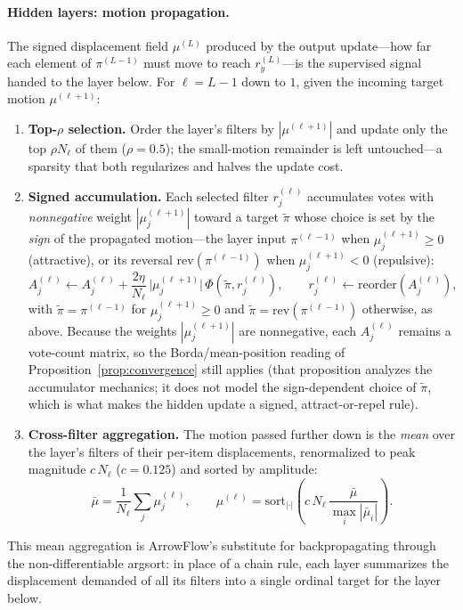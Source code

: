 \documentclass[12pt]{article}
\begin{document}
\paragraph{Hidden layers: motion propagation.}
The signed displacement field $\mu^{(L)}$ produced by the output update---how far each element of $\pi^{(L-1)}$ must move to reach $r^{(L)}_y$---is the supervised signal handed to the layer below. For $\ell = L-1$ down to $1$, given the incoming target motion $\mu^{(\ell+1)}$:
\begin{enumerate}[leftmargin=2em,topsep=2pt]
\item \textbf{Top-$\rho$ selection.} Order the layer's filters by $|\mu^{(\ell+1)}|$ and update only the top $\rho N_\ell$ of them ($\rho = 0.5$); the small-motion remainder is left untouched---a sparsity that both regularizes and halves the update cost.
\item \textbf{Signed accumulation.} Each selected filter $r^{(\ell)}_j$ accumulates votes with \emph{nonnegative} weight $|\mu^{(\ell+1)}_j|$ toward a target $\tilde{\pi}$ whose choice is set by the \emph{sign} of the propagated motion---the layer input $\pi^{(\ell-1)}$ when $\mu^{(\ell+1)}_j \ge 0$ (attractive), or its reversal $\mathrm{rev}(\pi^{(\ell-1)})$ when $\mu^{(\ell+1)}_j < 0$ (repulsive):
\begin{equation}
\label{eq:hidden-update}
A^{(\ell)}_j \leftarrow A^{(\ell)}_j + \frac{2\eta}{N_\ell}\,\bigl|\mu^{(\ell+1)}_j\bigr|\,\Phi\!\left(\tilde{\pi}, r^{(\ell)}_j\right), \qquad
r^{(\ell)}_j \leftarrow \mathrm{reorder}(A^{(\ell)}_j),
\end{equation}
with $\tilde{\pi} = \pi^{(\ell-1)}$ for $\mu^{(\ell+1)}_j \ge 0$ and $\tilde{\pi} = \mathrm{rev}(\pi^{(\ell-1)})$ otherwise, as above.
Because the weights $|\mu^{(\ell+1)}_j|$ are nonnegative, each $A^{(\ell)}_j$ remains a vote-count matrix, so the Borda/mean-position reading of Proposition~\ref{prop:convergence} still applies (that proposition analyzes the accumulator mechanics; it does not model the sign-dependent choice of $\tilde{\pi}$, which is what makes the hidden update a signed, attract-or-repel rule).
\item \textbf{Cross-filter aggregation.} The motion passed further down is the \emph{mean} over the layer's filters of their per-item displacements, renormalized to peak magnitude $c\,N_\ell$ ($c = 0.125$) and sorted by amplitude:
\[
\bar{\mu} = \frac{1}{N_\ell}\sum_j \mu^{(\ell)}_{j}, \qquad
\mu^{(\ell)} = \mathrm{sort}_{|\cdot|}\!\left(c\,N_\ell\,\frac{\bar{\mu}}{\max_i |\bar{\mu}_i|}\right).
\]
\end{enumerate}
This mean aggregation is ArrowFlow's substitute for backpropagating through the non-differentiable argsort: in place of a chain rule, each layer summarizes the displacement demanded of all its filters into a single ordinal target for the layer below.
\end{document}
